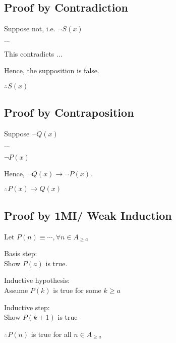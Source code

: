 \documentclass[12pt, a4paper]{article}
\begin{document}
\begin{multicols*}{3}
\subsection{Proof by Contradiction}
\begin{enumproof}[parsep=0em]
  \item Suppose not, i.e. $\neg S(x)$
    \begin{enumproof}[parsep=0em]
  \item $...$
  \item This contradicts ...
  \end{enumproof}
  \item Hence, the supposition is false.
  \item $\therefore S(x)$
\end{enumproof}

\subsection{Proof by Contraposition}
\begin{enumproof}[parsep=0em]
  \item Suppose $\neg Q(x)$
    \begin{enumproof}[parsep=0em]
  \item $...$
  \item $\neg P(x)$
  \end{enumproof}
  \item Hence, $\neg Q(x) \rightarrow \neg P(x)$.
  \item $\therefore P(x) \rightarrow Q(x)$
\end{enumproof}

\colbreak
\subsection{Proof by 1MI/ Weak Induction}
\begin{enumproof}[parsep=0em]
\item Let $P(n) \equiv \cdots, \forall n \in A_{\geq a}$
  \item Basis step:\\Show $P(a)$ is true.
  \item Inductive hypothesis:\\Assume $P(k)$ is true for some $k \geq a$
  \item Inductive step:\\Show $P(k+1)$ is true
  \item $\therefore P(n)$ is true for all $n \in A_{\geq a}$
\end{enumproof}


\end{multicols*}
\end{document}
